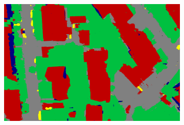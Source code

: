 \begin{figure}[htb]
\begin{subfigure}{0.243\columnwidth}
\end{subfigure}
\begin{subfigure}{0.243\columnwidth}
  \centering
  \includegraphics[width=1\linewidth]{fig/segmentation/DSC00837_6000_autocrf.png}
\end{subfigure}


\end{figure}
